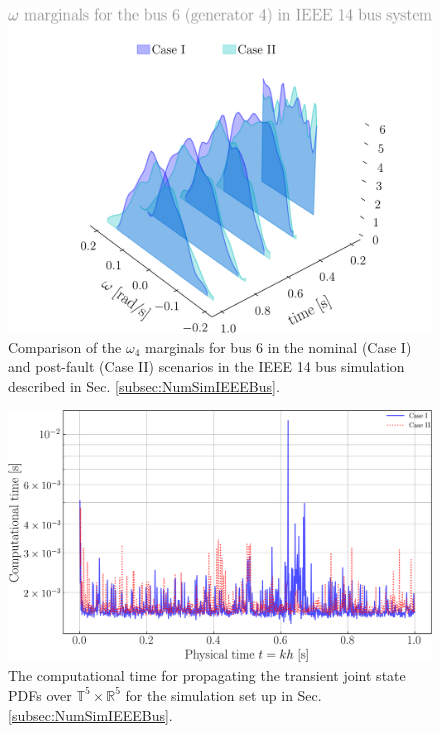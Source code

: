 \documentclass[10pt,twocolumn]{IEEEtran}
\begin{document}
\begin{figure}[ht!]
\includegraphics[width=0.85\linewidth]{Case0Case1Combined_Gen4_OmegaMarginals.png}
\caption{\small{Comparison of the $\omega_{4}$ marginals for bus 6 in the nominal (Case I) and post-fault (Case II) scenarios in the IEEE 14 bus simulation described in Sec. \ref{subsec:NumSimIEEEBus}.}}
\vspace*{-0.1in}
\label{fig:IEEE14omegamarginalsCase12}
\end{figure}




\begin{figure}[t]
\centering
\includegraphics[width=0.8\linewidth]{ComputationalTimeSyntheticIEEE14busCase1and2combined.png}
\caption{\small{The computational time for propagating the transient joint state PDFs over $\mathbb{T}^{5}\times\mathbb{R}^{5}$ for the simulation set up in Sec. \ref{subsec:NumSimIEEEBus}.}}
\vspace*{-0.2in}
\label{fig:CompTimeIEEE14bus}
\end{figure}
\end{document}
